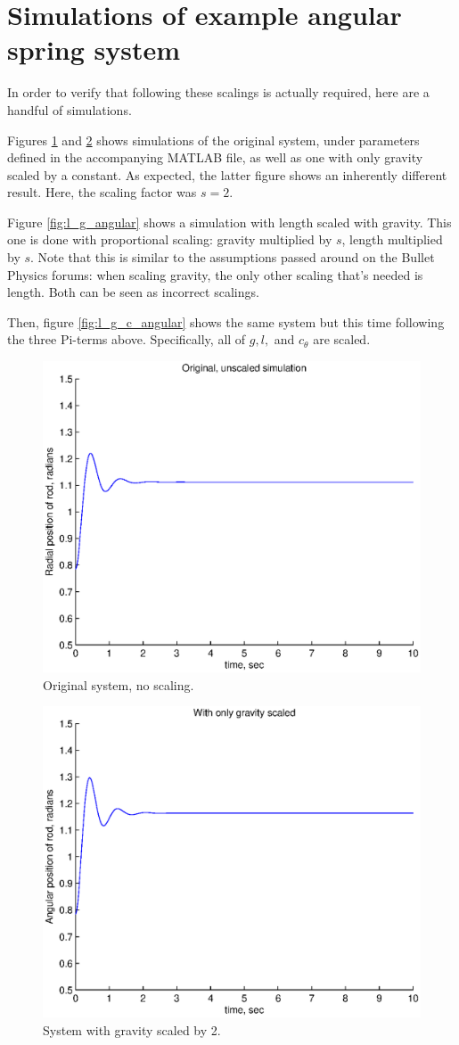 \documentclass[12pt,letterpaper]{article}
\begin{document}


\section{Simulations of example angular spring system}

In order to verify that following these scalings is actually required, here are a handful of simulations.

Figures \ref{fig:original_angular} and \ref{fig:grav_only_angular} shows simulations of the original system, under parameters defined in the accompanying MATLAB file, as well as one with only gravity scaled by a constant.
As expected, the latter figure shows an inherently different result.
Here, the scaling factor was $s=2$.

Figure \ref{fig:l_g_angular} shows a simulation with length scaled with gravity.
This one is done with proportional scaling: gravity multiplied by $s$, length multiplied by $s$.
Note that this is similar to the assumptions passed around on the Bullet Physics forums: when scaling gravity, the only other scaling that's needed is length.
Both can be seen as incorrect scalings.

Then, figure \ref{fig:l_g_c_angular} shows the same system but this time following the three Pi-terms above.
Specifically, all of $g, l,$ and $c_{\theta}$ are scaled.

\begin{figure}[ht]
  \centering
  \includegraphics[width=.48\linewidth]{img/original_angular.eps}
  \caption{Original system, no scaling. }
  \label{fig:original_angular}
\end{figure}

\begin{figure}[ht]
  \centering
  \includegraphics[width=.48\linewidth]{img/grav_only_angular.eps}
  \caption{System with gravity scaled by 2. }
  \label{fig:grav_only_angular}
\end{figure}
\end{document}
